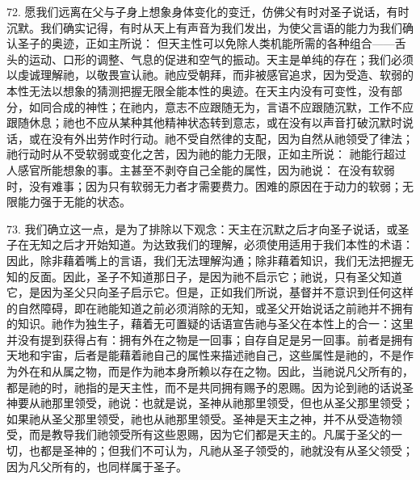 72. 愿我们远离在父与子身上想象身体变化的变迁，仿佛父有时对圣子说话，有时沉默。我们确实记得，有时从天上有声音为我们发出，为使父言语的能力为我们确认圣子的奥迹，正如主所说： 但天主性可以免除人类机能所需的各种组合——舌头的运动、口形的调整、气息的促进和空气的振动。天主是单纯的存在；我们必须以虔诚理解祂，以敬畏宣认祂。祂应受朝拜，而非被感官追求，因为受造、软弱的本性无法以想象的猜测把握无限全能本性的奥迹。在天主内没有可变性，没有部分，如同合成的神性；在祂内，意志不应跟随无为，言语不应跟随沉默，工作不应跟随休息；祂也不应从某种其他精神状态转到意志，或在没有以声音打破沉默时说话，或在没有外出劳作时行动。祂不受自然律的支配，因为自然从祂领受了律法；祂行动时从不受软弱或变化之苦，因为祂的能力无限，正如主所说： 祂能行超过人感官所能想象的事。主甚至不剥夺自己全能的属性，因为祂说： 在没有软弱时，没有难事；因为只有软弱无力者才需要费力。困难的原因在于动力的软弱；无限能力强于无能的状态。\par

73. 我们确立这一点，是为了排除以下观念：天主在沉默之后才向圣子说话，或圣子在无知之后才开始知道。为达致我们的理解，必须使用适用于我们本性的术语：因此，除非藉着嘴上的言语，我们无法理解沟通；除非藉着知识，我们无法把握无知的反面。因此，圣子不知道那日子，是因为祂不启示它；祂说，只有圣父知道它，是因为圣父只向圣子启示它。但是，正如我们所说，基督并不意识到任何这样的自然障碍，即在祂能知道之前必须消除的无知，或圣父开始说话之前祂并不拥有的知识。祂作为独生子，藉着无可置疑的话语宣告祂与圣父在本性上的合一：这里并没有提到获得占有：拥有外在之物是一回事；自存自足是另一回事。前者是拥有天地和宇宙，后者是能藉着祂自己的属性来描述祂自己，这些属性是祂的，不是作为外在和从属之物，而是作为祂本身所赖以存在之物。因此，当祂说凡父所有的，都是祂的时，祂指的是天主性，而不是共同拥有赐予的恩赐。因为论到祂的话说圣神要从祂那里领受，祂说：也就是说，圣神从祂那里领受，但也从圣父那里领受；如果祂从圣父那里领受，祂也从祂那里领受。圣神是天主之神，并不从受造物领受，而是教导我们祂领受所有这些恩赐，因为它们都是天主的。凡属于圣父的一切，也都是圣神的；但我们不可认为，凡祂从圣子领受的，祂就没有从圣父领受；因为凡父所有的，也同样属于圣子。\par

